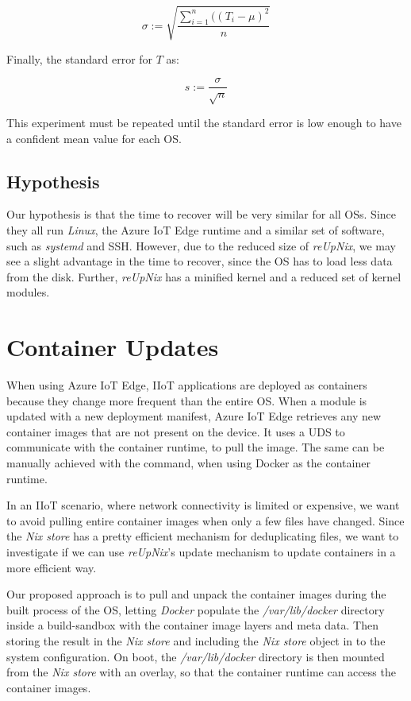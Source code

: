\begin{equation}
   \sigma := \sqrt{\frac{\sum_{i=1}^{n}((T_i - \mu)^2}{n}}
\end{equation}

\noindent
Finally, the standard error for $T$ as:

\begin{equation}
    s := \frac{\sigma}{\sqrt{n}}
\end{equation}

\noindent
This experiment must be repeated until the standard error is low enough
to have a confident mean value for each \ac{OS}.

\subsection{Hypothesis}
Our hypothesis is that the time to recover will be very similar for all
\ac{OS}s. Since they all run \textit{Linux}, the Azure IoT Edge runtime and
a similar set of software, such as \textit{systemd} and \ac{SSH}. However, due
to the reduced size of \textit{reUpNix}, we may see a slight advantage in the
time to recover, since the \ac{OS} has to load less data from the disk. Further,
\textit{reUpNix} has a minified kernel and a reduced set of kernel modules.

\section{Container Updates}
When using Azure IoT Edge, \ac{IIoT} applications are deployed as containers because
they change more frequent than the entire \ac{OS}. When a module is updated
with a new deployment manifest, Azure IoT Edge retrieves any new container
images that are not present on the device. It uses a \ac{UDS} to communicate
with the container runtime, to pull the image. The same can be manually achieved
with the  command, when using Docker as the container runtime.

In an \ac{IIoT} scenario, where network connectivity is limited or expensive,
we want to avoid pulling entire container images when only a few files have
changed. Since the \textit{Nix store} has a pretty efficient mechanism for
deduplicating files, we want to investigate if we can use \textit{reUpNix}'s
update mechanism to update containers in a more efficient way.

Our proposed approach is to pull and unpack the container images during the built
process of the \ac{OS}, letting \textit{Docker} populate the \textit{/var/lib/docker}
directory inside a build-sandbox with the container image layers and meta data.
Then storing the result in the \textit{Nix store} and including the
\textit{Nix store} object in to the system configuration. On boot, the
\textit{/var/lib/docker} directory is then mounted from the \textit{Nix store}
with an overlay, so that the container runtime can access the container images.

